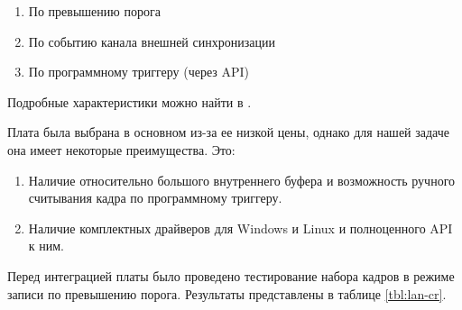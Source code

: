 \documentclass[a4paper,14pt]{extreport}
\begin{document}
\begin{enumerate}
    \item По превышению порога
    \item По событию канала внешней синхронизации
    \item По программному триггеру (через API)
\end{enumerate}
Подробные характеристики можно найти в .

Плата была выбрана в основном из-за ее низкой цены, однако для нашей задаче она имеет некоторые преимущества. Это:

\begin{enumerate}
    \item Наличие относительно большого внутреннего буфера и возможность ручного считывания кадра по программному триггеру.
    \item Наличие комплектных драйверов для Windows и Linux и полноценного API к ним.
\end{enumerate}
Перед интеграцией платы было проведено тестирование набора кадров в режиме записи по превышению порога. Результаты представлены в таблице \ref{tbl:lan-cr}.
\end{document}
